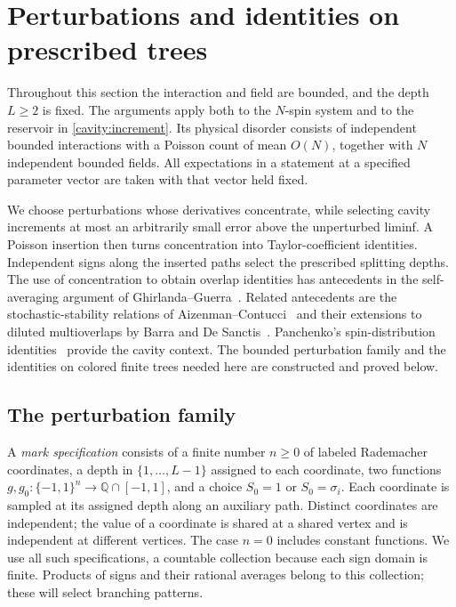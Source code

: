 \section{Perturbations and identities on prescribed trees}
\label{pert:section}

Throughout this section the interaction and field are bounded, and the
depth $L\geq2$ is fixed.  The arguments apply both to the $N$-spin system
and to the reservoir in \cref{cavity:increment}. Its physical disorder
consists of independent bounded interactions with a Poisson count of
mean $O(N)$, together with $N$ independent bounded fields.
All expectations in a statement at a specified parameter vector are
taken with that vector held fixed.

We choose perturbations whose derivatives concentrate, while selecting
cavity increments at most an arbitrarily small error above the
unperturbed liminf. A Poisson insertion
then turns concentration into Taylor-coefficient identities. Independent
signs along the inserted paths select the prescribed splitting depths.
The use of concentration to obtain overlap identities has antecedents
in the self-averaging argument of Ghirlanda--Guerra~\cite{GG98}.
Related antecedents are the stochastic-stability relations of
Aizenman--Contucci~\cite{AC98} and their extensions to diluted
multioverlaps by Barra and De Sanctis~\cite{BarraDeSanctis07}.
Panchenko's spin-distribution identities~\cite{Pan13} provide the cavity
context. The bounded perturbation family and the identities on colored
finite trees needed here are constructed and proved below.

\subsection{The perturbation family}

A \emph{mark specification} consists of a finite number $n\geq0$ of
labeled Rademacher coordinates, a depth in $\{1,\ldots,L-1\}$ assigned
to each coordinate, two functions
$g,g_0:\{-1,1\}^n\to\mathbb Q\cap[-1,1]$, and a choice $S_0=1$ or
$S_0=\sigma_i$. Each coordinate is sampled at its assigned depth along
an auxiliary path. Distinct coordinates are independent; the value of
a coordinate is shared at a shared vertex and is independent at
different vertices. The case $n=0$ includes constant functions.
We use all such specifications, a countable collection because each
sign domain is finite. Products of signs and their rational averages
belong to this collection; these will select branching patterns.

